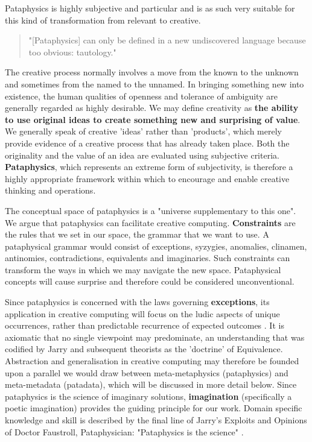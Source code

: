 Pataphysics is highly subjective and particular and is as such very suitable for this kind of transformation from relevant to creative.

\begin{quote}
  "[Pataphysics] can only be defined in a new undiscovered language because too obvious: tautology." \citep{Baudrillard2007}
\end{quote}

The creative process normally involves a move from the known to the unknown and sometimes from the named to the unnamed. In bringing something new into existence, the human qualities of openness and tolerance of ambiguity are generally regarded as highly desirable. We may define creativity as \textbf{the ability to use original ideas to create something new and surprising of value}. We generally speak of creative 'ideas' rather than 'products', which merely provide evidence of a creative process that has already taken place. Both the originality and the value of an idea are evaluated using subjective criteria. \textbf{Pataphysics}, which represents an extreme form of subjectivity, is therefore a highly appropriate framework within which to encourage and enable creative thinking and operations.

The conceptual space of pataphysics is a "universe supplementary to this one"\citep[p.21]{Jarry1996}. We argue that pataphysics can facilitate creative computing. \textbf{Constraints} are the rules that we set in our space, the grammar that we want to use. A pataphysical grammar would consist of exceptions, syzygies, anomalies, clinamen, antinomies, contradictions, equivalents and imaginaries. Such constraints can transform the ways in which we may navigate the new space. Pataphysical concepts will cause surprise and therefore could be considered unconventional.

Since pataphysics is concerned with the laws governing \textbf{exceptions}, its application in creative computing will focus on the ludic aspects of unique occurrences, rather than predictable recurrence of expected outcomes \citep{Bok2002}. It is axiomatic that no single viewpoint may predominate, an understanding that was codified by Jarry and subsequent theorists as the 'doctrine' of Equivalence. Abstraction and generalisation in creative computing may therefore be founded upon a parallel we would draw between meta-metaphysics (pataphysics) and meta-metadata (patadata), which will be discussed in more detail below. Since pataphysics is the science of imaginary solutions, \textbf{imagination} (specifically a poetic imagination) provides the guiding principle for our work. Domain specific knowledge and skill is described by the final line of Jarry's Exploits and Opinions of Doctor Faustroll, Pataphysician: "Pataphysics is the science" \citep[p.114]{Jarry1996}.

